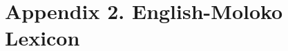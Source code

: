 \begin{multicols}{2}
\begin{styleEntryParagraph}
  
\end{styleEntryParagraph}

\begin{styleEntryParagraph}
  
\end{styleEntryParagraph}

\begin{styleEntryParagraph}
  
\end{styleEntryParagraph}

\begin{styleEntryParagraph}
  
\end{styleEntryParagraph}

\begin{styleEntryParagraph}
  
\end{styleEntryParagraph}
\end{multicols}

\setcounter{page}{1}\chapter[Appendix 2. English{}-Moloko Lexicon]{Appendix 2. English-Moloko Lexicon}
\hypertarget{RefHeading1213681525720847}{}\begin{styleLetterParagraph}
\thepage{}
\end{styleLetterParagraph}

